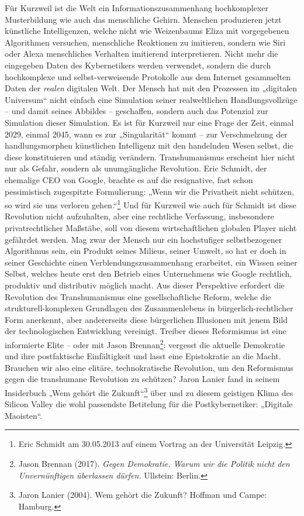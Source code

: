 \documentclass[12pt,a4paper]{article}
\begin{document}
Für Kurzweil ist die Welt ein Informationszusammenhang hochkomplexer
Musterbildung wie auch das menschliche Gehirn. Menschen produzieren jetzt
künstliche Intelligenzen, welche nicht wie Weizenbaums Eliza mit vorgegebenen
Algorithmen versuchen, menschliche Reaktionen zu imitieren, sondern wie Siri
oder Alexa menschliches Verhalten imitierend interpretieren. Nicht mehr die
eingegeben Daten des Kybernetikers werden verwendet, sondern die durch
hochkomplexe und selbst-verweisende Protokolle aus dem Internet gesammelten
Daten der \emph{realen} digitalen Welt. Der Mensch hat mit den Prozessen im
„digitalen Universum“ nicht einfach eine Simulation seiner realweltlichen
Handlungsvollzüge -- und damit seines Abbildes -- geschaffen, sondern auch das
Potenzial zur Simulation dieser Simulation. Es ist für Kurzweil nur eine Frage
der Zeit, einmal 2029, einmal 2045, wann es zur „Singularität“ kommt -- zur
Verschmelzung der handlungsmorphen künstlichen Intelligenz mit den handelnden
Wesen selbst, die diese konstituieren und ständig verändern.  Transhumanismus
erscheint hier nicht nur als Gefahr, sondern als unumgängliche
Revolution. Eric Schmidt, der ehemalige CEO von Google, brachte es auf die
resignative, fast schon pessimistisch zugespitzte Formulierung: „Wenn wir die
Privatheit nicht schützen, so wird sie uns verloren gehen.“\footnote{Eric
  Schmidt am 30.05.2013 auf einem Vortrag an der Universität Leipzig.} Und für
Kurzweil wie auch für Schmidt ist diese Revolution nicht aufzuhalten, aber
eine rechtliche Verfassung, insbesondere privatrechtlicher Maßstäbe, soll von
diesem wirtschaftlichen globalen Player nicht gefährdet werden. Mag zwar der
Mensch nur ein hochstufiger selbstbezogener Algorithmus sein, ein Produkt
seines Milieus, seiner Umwelt, so hat er doch in seiner Geschichte einen
Verblendungszusammenhang erarbeitet, ein Wissen seiner Selbst, welches heute
erst den Betrieb eines Unternehmens wie Google rechtlich, produktiv und
distributiv möglich macht. Aus dieser Perspektive erfordert die Revolution des
Transhumanismus eine gesellschaftliche Reform, welche die
strukturell-komplexen Grundlagen des Zusammenlebens in bürgerlich-rechtlicher
Form anerkennt, aber andererseits diese bürgerlichen Illusionen mit jenem Bild
der technologischen Entwicklung vereinigt. Treiber dieses Reformismus ist eine
informierte Elite -- oder mit Jason Brennan\footnote{Jason Brennan (2017).
  \emph{Gegen Demokratie. Warum wir die Politik nicht den Unvernünftigen
    überlassen dürfen.} Ullstein: Berlin.}: vergesst die aktuelle Demokratie
und ihre postfaktische Einfältigkeit und lasst eine Epistokratie an die Macht.
Brauchen wir also eine elitäre, technokratische Revolution, um den Reformismus
gegen die transhumane Revolution zu schützen?  Jaron Lanier fand in seinem
Insiderbuch „Wem gehört die Zukunft“\footnote{Jaron Lanier (2004). Wem gehört
  die Zukunft? Hoffman und Campe: Hamburg.} über und zu diesem geistigen Klima
des Silicon Valley die wohl passendste Betitelung für die Postkybernetiker:
„Digitale Maoisten“.
\end{document}

